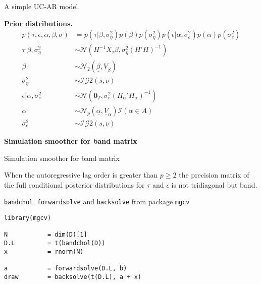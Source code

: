 \documentclass[notes,blackandwhite,mathsans,usenames,dvipsnames]{beamer}
\begin{document}
\begin{frame}{A simple UC-AR model}

\bigskip\textbf{Prior distributions.}\small
\begin{align*}
p(\tau,\epsilon,\alpha,\beta,\sigma) &= p\left(\tau|\beta,\sigma^2_\eta\right)p(\beta)p\left(\sigma^2_\eta\right)
p\left(\epsilon|\alpha,\sigma^2_e\right)p(\alpha)p\left(\sigma^2_e\right)\\[2ex]
\tau|\beta,\sigma^2_\eta &\sim\mathcal{N}\left(H^{-1} X_\tau \beta, \sigma^2_\eta (H'H)^{-1}\right)\\
\beta&\sim\mathcal{N}_2\left(\underline{\beta},\underline{V}_{\beta}\right)\\
\sigma^2_\eta&\sim\mathcal{IG}2\left(\underline{s},\underline{\nu}\right)\\[2ex]
\epsilon|\alpha,\sigma^2_e &\sim\mathcal{N}\left(\mathbf{0}_T, \sigma^2_e (H_{\alpha}'H_{\alpha})^{-1}\right)\\
\alpha&\sim\mathcal{N}_p\left(\underline{\alpha},\underline{V}_{\alpha}\right)\mathcal{I}(\alpha\in A)\\
\sigma^2_e&\sim\mathcal{IG}2\left(\underline{s},\underline{\nu}\right)
\end{align*}

\end{frame}







{
\begin{frame}

\begin{adjustwidth}{-0.5cm}{0cm}
\vspace{8.3cm}
\Large\textbf{{\color{mcxs2}Simulation smoother} {\color{mcxs3} for band matrix}}
\end{adjustwidth}

\end{frame}
}


\begin{frame}[fragile]{Simulation smoother for band matrix}

{\color{mcxs2}When the autoregressive lag order is greater than} $p\geq2$ {\color{mcxs2}the precision matrix of the full conditional posterior distributions for} $\tau$ {\color{mcxs2}and} $\epsilon$ {\color{mcxs2}is not tridiagonal but} band.

 \texttt{bandchol}, \texttt{forwardsolve} {\color{mcxs2}and} \texttt{backsolve} {\color{mcxs2}from package} \texttt{mgcv}

\begin{verbatim}
library(mgcv)

N           = dim(D)[1]
D.L         = t(bandchol(D))
x           = rnorm(N)

a           = forwardsolve(D.L, b)
draw        = backsolve(t(D.L), a + x)
\end{verbatim}

\end{frame}
\end{document}

